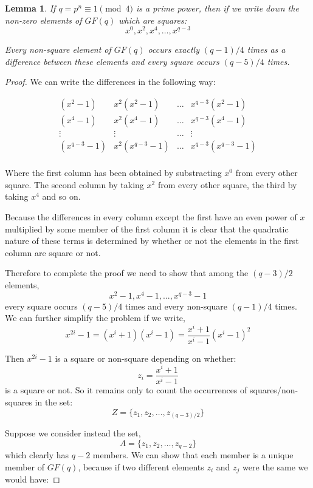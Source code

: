 \documentclass[
  11pt,
  a4paper]{book}
\newtheorem{lemma}[theorem]{Lemma}
\begin{document}
\begin{lemma}
If $q = p^n \equiv 1\pmod 4$ is a prime power, then if we
write down the non-zero elements of $GF(q)$ which are
squares: $$x^0, x^2, x^4, \ldots, x^{q - 3}$$

Every non-square element of $GF(q)$ occurs exactly $(q -
1)/4$ times as a difference between these elements and every
square occurs $(q - 5)/4$ times.
\end{lemma}

\begin{proof}
We can write the differences in the following way:

\begin{equation}
\begin{array}{cccc}
     (x^2-1)   &  x^{2}(x^{2}-1)  & \ldots  & x^{q-3}(x^{2}-1)   \\
     (x^4-1)   &  x^{2}(x^{4}-1)  & \ldots  & x^{q-3}(x^{4}-1)   \\
      \vdots   &     \vdots       & \ldots  &      \vdots        \\
   (x^{q-3}-1) & x^{2}(x^{q-3}-1) & \ldots  & x^{q-3}(x^{q-3}-1) \\
\end{array}
\end{equation}

Where the first column has been obtained by substracting
$x^0$ from every other square. The second column by taking
$x^2$ from every other square, the third by taking $x^4$ and
so on.

Because the differences in every column except the first
have an even power of $x$ multiplied by some member of the
first column it is clear that the quadratic nature of these
terms is determined by whether or not the elements in the
first column are square or not.

Therefore to complete the proof we need to show that among
the $(q-3)/2$ elements, $$x^2-1,x^4-1,...,x^{q-3}-1$$ every
square occurs $(q-5)/4$ times and every non-square $(q-1)/4$
times. We can further simplify the problem if we write,
$$x^{2i}-1=(x^i+1)(x^i-1)=\frac{x^i+1}{x^i-1}(x^i-1)^2$$

Then $x^{2i}-1$ is a square or non-square depending on
whether:
$$z_i = \frac{x^i + 1}{x^i - 1}$$
is a square or not. So it remains only to count the
occurrences of squares/non-squares in the set:
$$Z = \{z_1, z_2, \ldots, z_{(q - 3)/2}\}$$

Suppose we consider instead the set,
$$A = \{z_1, z_2, \ldots, z_{q - 2}\}$$
which clearly has $q-2$ members. We can
show that each member is a unique member
of $GF(q)$, because if two different elements
$z_i$ and $z_j$ were the same we would have:


\end{proof}
\end{document}

